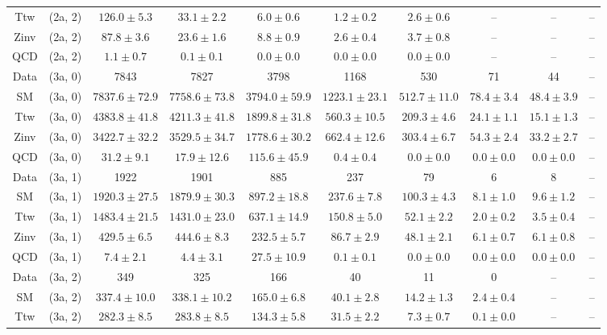 \begin{table}[h!]
{\begin{tabular}{cccccccccc}
	Ttw & (2a, 2) & $126.0\pm 5.3$ & $33.1\pm 2.2$ & $6.0\pm 0.6$ & $1.2\pm 0.2$ & $2.6\pm 0.6$ & -- & -- & -- \\[0.5ex] 
	Zinv & (2a, 2) & $87.8\pm 3.6$ & $23.6\pm 1.6$ & $8.8\pm 0.9$ & $2.6\pm 0.4$ & $3.7\pm 0.8$ & -- & -- & -- \\[0.5ex] 
	QCD & (2a, 2) & $1.1\pm 0.7$ & $0.1\pm 0.1$ & $0.0\pm 0.0$ & $0.0\pm 0.0$ & $0.0\pm 0.0$ & -- & -- & -- \\[0.5ex] 
	Data & (3a, 0) & 7843 & 7827 & 3798 & 1168 & 530 & 71 & 44 & -- \\[0.5ex] 
	SM & (3a, 0) & $7837.6\pm 72.9$ & $7758.6\pm 73.8$ & $3794.0\pm 59.9$ & $1223.1\pm 23.1$ & $512.7\pm 11.0$ & $78.4\pm 3.4$ & $48.4\pm 3.9$ & -- \\[0.5ex] 
	Ttw & (3a, 0) & $4383.8\pm 41.8$ & $4211.3\pm 41.8$ & $1899.8\pm 31.8$ & $560.3\pm 10.5$ & $209.3\pm 4.6$ & $24.1\pm 1.1$ & $15.1\pm 1.3$ & -- \\[0.5ex] 
	Zinv & (3a, 0) & $3422.7\pm 32.2$ & $3529.5\pm 34.7$ & $1778.6\pm 30.2$ & $662.4\pm 12.6$ & $303.4\pm 6.7$ & $54.3\pm 2.4$ & $33.2\pm 2.7$ & -- \\[0.5ex] 
	QCD & (3a, 0) & $31.2\pm 9.1$ & $17.9\pm 12.6$ & $115.6\pm 45.9$ & $0.4\pm 0.4$ & $0.0\pm 0.0$ & $0.0\pm 0.0$ & $0.0\pm 0.0$ & -- \\[0.5ex] 
	Data & (3a, 1) & 1922 & 1901 & 885 & 237 & 79 & 6 & 8 & -- \\[0.5ex] 
	SM & (3a, 1) & $1920.3\pm 27.5$ & $1879.9\pm 30.3$ & $897.2\pm 18.8$ & $237.6\pm 7.8$ & $100.3\pm 4.3$ & $8.1\pm 1.0$ & $9.6\pm 1.2$ & -- \\[0.5ex] 
	Ttw & (3a, 1) & $1483.4\pm 21.5$ & $1431.0\pm 23.0$ & $637.1\pm 14.9$ & $150.8\pm 5.0$ & $52.1\pm 2.2$ & $2.0\pm 0.2$ & $3.5\pm 0.4$ & -- \\[0.5ex] 
	Zinv & (3a, 1) & $429.5\pm 6.5$ & $444.6\pm 8.3$ & $232.5\pm 5.7$ & $86.7\pm 2.9$ & $48.1\pm 2.1$ & $6.1\pm 0.7$ & $6.1\pm 0.8$ & -- \\[0.5ex] 
	QCD & (3a, 1) & $7.4\pm 2.1$ & $4.4\pm 3.1$ & $27.5\pm 10.9$ & $0.1\pm 0.1$ & $0.0\pm 0.0$ & $0.0\pm 0.0$ & $0.0\pm 0.0$ & -- \\[0.5ex] 
	Data & (3a, 2) & 349 & 325 & 166 & 40 & 11 & 0 & -- & -- \\[0.5ex] 
	SM & (3a, 2) & $337.4\pm 10.0$ & $338.1\pm 10.2$ & $165.0\pm 6.8$ & $40.1\pm 2.8$ & $14.2\pm 1.3$ & $2.4\pm 0.4$ & -- & -- \\[0.5ex] 
	Ttw & (3a, 2) & $282.3\pm 8.5$ & $283.8\pm 8.5$ & $134.3\pm 5.8$ & $31.5\pm 2.2$ & $7.3\pm 0.7$ & $0.1\pm 0.0$ & -- & -- \\[0.5ex] 

\end{tabular}}
\end{table}
